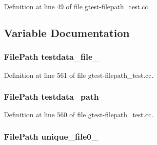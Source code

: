 \-Definition at line 49 of file gtest-\/filepath\-\_\-test.\-cc.



\subsection{\-Variable \-Documentation}
\hypertarget{gtest-filepath__test_8cc_ab25205b360de0f1648175ccbc1cc4365}{
\subsubsection[{testdata\-\_\-file\-\_\-}]{\setlength{\rightskip}{0pt plus 5cm}\-File\-Path {\bf testdata\-\_\-file\-\_\-}}}\label{dc/d76/gtest-filepath__test_8cc_ab25205b360de0f1648175ccbc1cc4365}


\-Definition at line 561 of file gtest-\/filepath\-\_\-test.\-cc.

\hypertarget{gtest-filepath__test_8cc_aed9839d60eafc7d5afbf14281a31caea}{
\subsubsection[{testdata\-\_\-path\-\_\-}]{\setlength{\rightskip}{0pt plus 5cm}\-File\-Path {\bf testdata\-\_\-path\-\_\-}}}\label{dc/d76/gtest-filepath__test_8cc_aed9839d60eafc7d5afbf14281a31caea}


\-Definition at line 560 of file gtest-\/filepath\-\_\-test.\-cc.

\hypertarget{gtest-filepath__test_8cc_adcfc0d513af262b152f09de5a6094636}{
\subsubsection[{unique\-\_\-file0\-\_\-}]{\setlength{\rightskip}{0pt plus 5cm}\-File\-Path {\bf unique\-\_\-file0\-\_\-}}}\label{dc/d76/gtest-filepath__test_8cc_adcfc0d513af262b152f09de5a6094636}


